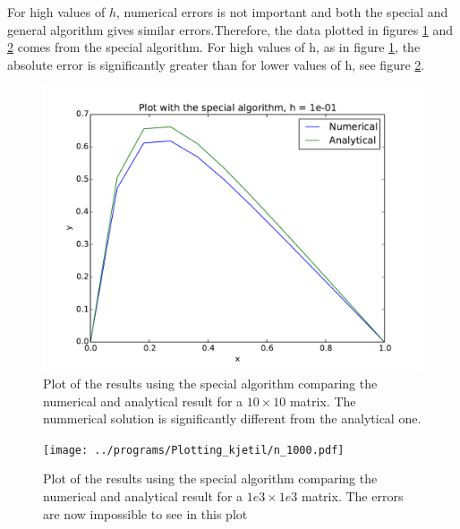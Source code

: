 For high values of $ h $, numerical errors is not important and both the special and general algorithm gives similar errors.Therefore, the data plotted in figures \ref{fig:num1e1} and \ref{fig:num1e3} comes from the special algorithm. For high values of h, as in figure \ref{fig:num1e1}, the absolute error is significantly greater than for lower values of h, see figure \ref{fig:num1e3}.  

\begin{figure}[H]
	\includegraphics[width = 1 \linewidth]{../programs/Plotting_kjetil/n_10.pdf}
	\caption{Plot of the results using the special algorithm comparing the numerical and analytical result for a $ 10\times 10 $ matrix. The  nummerical solution is significantly different from the analytical one.}
	\label{fig:num1e1}
\end{figure}


\begin{figure}[H]
	\texttt{[image: ../programs/Plotting\_kjetil/n\_1000.pdf]}
	\caption{Plot of the results using the special algorithm comparing the numerical and analytical result for a $ 1e3\times 1e3 $ matrix. The errors are now impossible to see in this plot}
	\label{fig:num1e3}
\end{figure}





